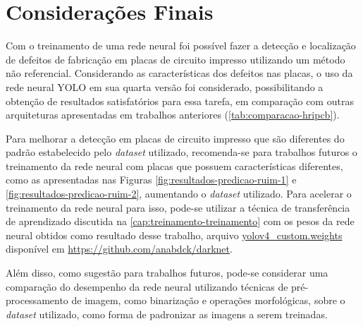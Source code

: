 \chapter{Considerações Finais}
Com o treinamento de uma rede neural foi possível fazer a detecção e localização de defeitos de fabricação em placas de circuito impresso utilizando um método não referencial. Considerando as características dos defeitos nas placas, o uso da rede neural YOLO em sua quarta versão foi considerado, possibilitando a obtenção de resultados satisfatórios para essa tarefa, em comparação com outras arquiteturas apresentadas em trabalhos anteriores (\autoref{tab:comparacao-hripcb}).

Para melhorar a detecção em placas de circuito impresso que são diferentes do padrão estabelecido pelo \textit{dataset} utilizado, recomenda-se para trabalhos futuros o treinamento da rede neural com placas que possuem características diferentes, como as apresentadas nas Figuras \ref{fig:resultados-predicao-ruim-1} e \ref{fig:resultados-predicao-ruim-2}, aumentando o \textit{dataset} utilizado.  Para acelerar o treinamento da rede neural para isso, pode-se utilizar a técnica de transferência de aprendizado discutida na \autoref{cap:treinamento-treinamento} com os pesos da rede neural obtidos como resultado desse trabalho, arquivo \url{yolov4_custom.weights} disponível em \url{https://github.com/anabdck/darknet}.

Além disso, como sugestão para trabalhos futuros, pode-se considerar uma comparação do desempenho da rede neural utilizando técnicas de pré-processamento de imagem, como binarização e operações morfológicas, sobre o \textit{dataset} utilizado, como forma de padronizar as imagens a serem treinadas.
